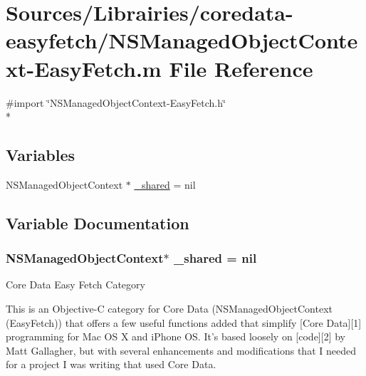 \hypertarget{_n_s_managed_object_context-_easy_fetch_8m}{\section{Sources/\-Librairies/coredata-\/easyfetch/\-N\-S\-Managed\-Object\-Context-\/\-Easy\-Fetch.m File Reference}
\label{_n_s_managed_object_context-_easy_fetch_8m}
}
{\ttfamily \#import \char`\"{}N\-S\-Managed\-Object\-Context-\/\-Easy\-Fetch.\-h\char`\"{}}\\*
\subsection*{Variables}
\begin{DoxyCompactItemize}
\item 
N\-S\-Managed\-Object\-Context $\ast$ \hyperlink{_n_s_managed_object_context-_easy_fetch_8m_a7d6bb52f50b87b856aa87b84d7c525a0}{\-\_\-shared} = nil
\end{DoxyCompactItemize}


\subsection{Variable Documentation}
\hypertarget{_n_s_managed_object_context-_easy_fetch_8m_a7d6bb52f50b87b856aa87b84d7c525a0}{
\subsubsection[{\-\_\-shared}]{\setlength{\rightskip}{0pt plus 5cm}N\-S\-Managed\-Object\-Context$\ast$ \-\_\-shared = nil}}\label{_n_s_managed_object_context-_easy_fetch_8m_a7d6bb52f50b87b856aa87b84d7c525a0}
Core Data Easy Fetch Category

This is an Objective-\/\-C category for Core Data ({\ttfamily N\-S\-Managed\-Object\-Context (Easy\-Fetch)}) that offers a few useful functions added that simplify \mbox{[}Core Data\mbox{]}\mbox{[}1\mbox{]} programming for Mac O\-S X and i\-Phone O\-S. It's based loosely on \mbox{[}code\mbox{]}\mbox{[}2\mbox{]} by Matt Gallagher, but with several enhancements and modifications that I needed for a project I was writing that used Core Data.

